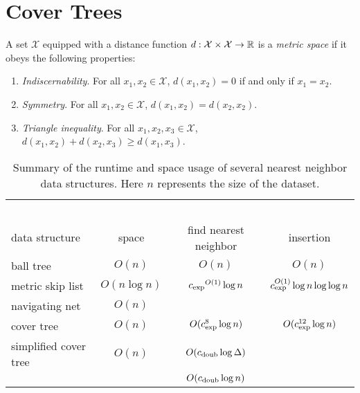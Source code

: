 \documentclass[../main.tex]{subfiles}
\newcommand{\set}[1]{\mathcal {#1}}
\newcommand{\dist}[2]{\distf({#1},{#2})}
\newcommand{\distf}{d}
\newcommand{\aspect}[1]{\Delta}
\newcommand{\krnum}{c_\textnormal{exp}}
\newcommand{\doubnum}{c_\textnormal{doub}}
\begin{document}
\chapter{Cover Trees}

\begin{definition}
    A set $\set X$ equipped with a distance function $\distf : \set X \times \set X \to \R$ is a \emph{metric space} if it obeys the following properties:
    \begin{enumerate}
        \item \emph{Indiscernability}.  For all $x_1,x_2\in\set X$, $\dist{x_1}{x_2} = 0$ if and only if $x_1=x_2$.
        \item \emph{Symmetry}. For all $x_1,x_2\in\set X$, $\dist{x_1}{x_2} = \dist{x_2}{x_2}$.
        \item \emph{Triangle inequality}.  For all $x_1,x_2,x_3\in\set X$, $\dist{x_1}{x_2} + \dist{x_2}{x_3}\ge\dist{x_1}{x_3}$.
    \end{enumerate}
\end{definition}

\begin{table}[H]
    \small
    \centering
    \begin{tabular}{lccc}
        \toprule
        \vspace{-0.25in}
        &~\hspace{1.2in}~&~\hspace{1.2in}~&~\hspace{1.2in}~\\
        data structure & space & find nearest neighbor & insertion \\
        \midrule
        ball tree \cite{} & $O(n)$ & $O(n)$ & $O(n)$ \\
        metric skip list \cite{karger2002finding} & $O(n\log n)$ & $\krnum{}^{O(1)}\log n$ & $\krnum^{O(1)}\log n\log\log n$ \\
        navigating net \cite{} & $O(n)$ \\
        cover tree \cite{} & $O(n)$ & $O(\krnum^8\log n)$ & $O(\krnum^{12}\log n)$ \\
        simplified cover tree & $O(n)$ & $O(\doubnum{}\log \aspect{})$ \\
                              &        & $O(\doubnum{}\log n)$ \\
        \bottomrule
    \end{tabular}
    \caption{
        Summary of the runtime and space usage of several nearest neighbor data structures.
        Here $n$ represents the size of the dataset.
    }
\end{table}
\end{document}
